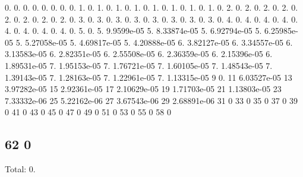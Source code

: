 0. 0. 0. 0. 0. 0. 0. 0. 1. 0. 1. 0. 1. 0. 1. 0. 1. 0. 1. 0. 1. 0. 1. 0. 2. 0. 2. 0. 2. 0. 2. 0. 2. 0. 2. 0. 2. 0. 2. 0. 3. 0. 3. 0. 3. 0. 3. 0. 3. 0. 3. 0. 3. 0. 3. 0. 4. 0. 4. 0. 4. 0. 4. 0. 4. 0. 4. 0. 4. 0. 4. 0. 5. 0. 5. 9.\+9599e-\/05 5. 8.\+33874e-\/05 5. 6.\+92794e-\/05 5. 6.\+25985e-\/05 5. 5.\+27058e-\/05 5. 4.\+69817e-\/05 5. 4.\+20888e-\/05 6. 3.\+82127e-\/05 6. 3.\+34557e-\/05 6. 3.\+13583e-\/05 6. 2.\+82351e-\/05 6. 2.\+55508e-\/05 6. 2.\+36359e-\/05 6. 2.\+15396e-\/05 6. 1.\+89531e-\/05 7. 1.\+95153e-\/05 7. 1.\+76721e-\/05 7. 1.\+60105e-\/05 7. 1.\+48543e-\/05 7. 1.\+39143e-\/05 7. 1.\+28163e-\/05 7. 1.\+22961e-\/05 7. 1.\+13315e-\/05 9 0. 11 6.\+03527e-\/05 13 3.\+97282e-\/05 15 2.\+92361e-\/05 17 2.\+10629e-\/05 19 1.\+71703e-\/05 21 1.\+13803e-\/05 23 7.\+33332e-\/06 25 5.\+22162e-\/06 27 3.\+67543e-\/06 29 2.\+68891e-\/06 31 0 33 0 35 0 37 0 39 0 41 0 43 0 45 0 47 0 49 0 51 0 53 0 55 0 58 0 \subsection*{62 0 }

Total\+: 0. 